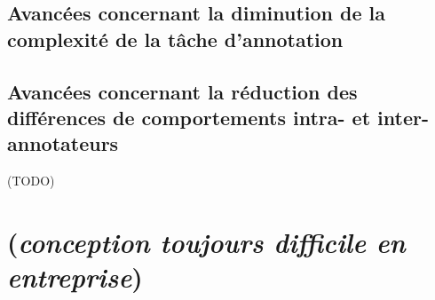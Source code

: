 		
		\subsection{Avancées concernant la diminution de la complexité de la tâche d'annotation}
		\label{section:2.4.2-AVANCEES-ANNOTATION-ASPECT-COMPLEXITE}
		
		
		\subsection{Avancées concernant la réduction des différences de comportements intra- et inter-annotateurs}
		\label{section:2.4.3-AVANCEES-ANNOTATION-ASPECT-HUMAIN}
		
		
		\begin{leftBarSummary}
			\begin{todolist}
				\item[\itemok] (TODO)
			\end{todolist}
		\end{leftBarSummary}

    \section{(\textit{conception toujours difficile en entreprise})}
	\label{section:2.5-RETOUR-EXPERIENCES-INDUSTRIELLES}
